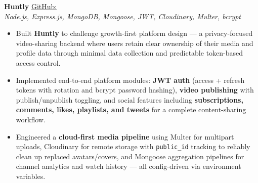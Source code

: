 %

\item \textbf{Huntly}
\href{https://github.com/Ank0it/Huntly}{GitHub: \faGithub} \\
\textit{Node.js, Express.js, MongoDB, Mongoose, JWT, Cloudinary, Multer, bcrypt}
\begin{itemize}
  \item Built \textbf{Huntly} to challenge growth-first platform design — a privacy-focused video-sharing backend where users retain clear ownership of their media and profile data through minimal data collection and predictable token-based access control.
  \item Implemented end-to-end platform modules: \textbf{JWT auth} (access + refresh tokens with rotation and bcrypt password hashing), \textbf{video publishing} with publish/unpublish toggling, and social features including \textbf{subscriptions, comments, likes, playlists, and tweets} for a complete content-sharing workflow.
  \item Engineered a \textbf{cloud-first media pipeline} using Multer for multipart uploads, Cloudinary for remote storage with \texttt{public\_id} tracking to reliably clean up replaced avatars/covers, and Mongoose aggregation pipelines for channel analytics and watch history — all config-driven via environment variables.
\end{itemize}
